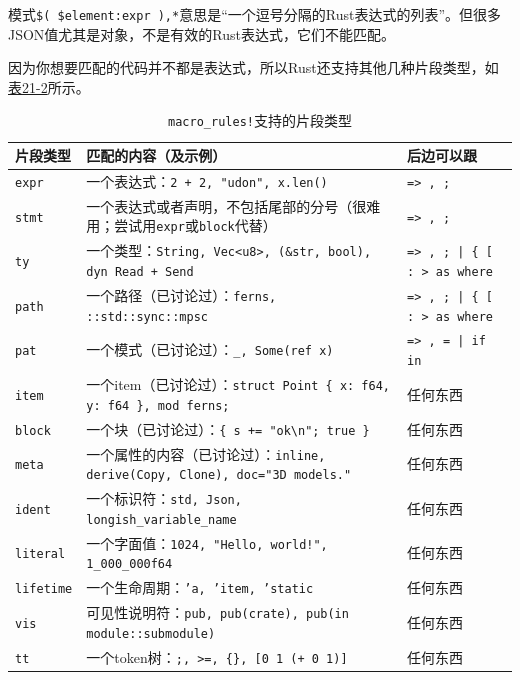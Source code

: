 模式\texttt{\$( \$element:expr ),*}意思是“一个逗号分隔的Rust表达式的列表”。但很多JSON值尤其是对象，不是有效的Rust表达式，它们不能匹配。

因为你想要匹配的代码并不都是表达式，所以Rust还支持其他几种片段类型，如\hyperref[t21-2]{表21-2}所示。

\begin{table}[htbp]
    \centering
    \caption{\texttt{macro\_rules!}支持的片段类型}
    \label{t21-2}
    \begin{tabular}{lp{}p{}}
        \hline
        \textbf{片段类型}   & \textbf{匹配的内容（及示例）} &   \textbf{后边可以跟} \\
        \hline
        \texttt{expr}   & 一个表达式：\texttt{2 + 2, "udon", x.len()}   & \texttt{=> , ;}   \\
        \rowcolor{tablecolor}
        \texttt{stmt}   & 一个表达式或者声明，不包括尾部的分号（很难用；尝试用\texttt{expr}或\texttt{block}代替）   & \texttt{=> , ;} \\
        \texttt{ty} & 一个类型：\texttt{String, Vec<u8>, (\&str, bool), dyn Read + Send}    & \texttt{=> , ; | \{ [ : > as where} \\
        \rowcolor{tablecolor}
        \texttt{path}   & 一个路径（已讨论过）：\texttt{ferns, ::std::sync::mpsc}   & \texttt{=> , ; | \{ [ : > as where} \\
        \texttt{pat}    & 一个模式（已讨论过）：\texttt{\_, Some(ref x)}    & \texttt{=> , = | if in} \\
        \rowcolor{tablecolor}
        \texttt{item}   & 一个item（已讨论过）：\texttt{struct Point \{ x: f64, y: f64 \}, mod ferns;}  & 任何东西 \\
        \texttt{block}  & 一个块（已讨论过）：\texttt{\{ s += "ok\textbackslash n"; true \}}  & 任何东西  \\
        \rowcolor{tablecolor}
        \texttt{meta}   & 一个属性的内容（已讨论过）：\texttt{inline, derive(Copy, Clone), doc="3D models."} & 任何东西 \\
        \texttt{ident}  & 一个标识符：\texttt{std, Json, longish\_variable\_name}   & 任何东西 \\
        \rowcolor{tablecolor}
        \texttt{literal}& 一个字面值：\texttt{1024, "Hello, world!", 1\_000\_000f64}    & 任何东西 \\
        \texttt{lifetime} & 一个生命周期：\texttt{'a, 'item, 'static}   & 任何东西 \\
        \rowcolor{tablecolor}
        \texttt{vis}    & 可见性说明符：\texttt{pub, pub(crate), pub(in module::submodule)} & 任何东西 \\
        \texttt{tt}     & 一个token树：\texttt{;, >=, \{\}, [0 1 (+ 0 1)]}  & 任何东西 \\
    \end{tabular}
\end{table}

